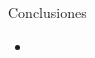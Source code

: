 \documentclass{beamer}
\begin{document}
\begin{frame}{Conclusiones}
	\begin{itemize}
		\item 
	\end{itemize}
\end{frame}

\end{document}
